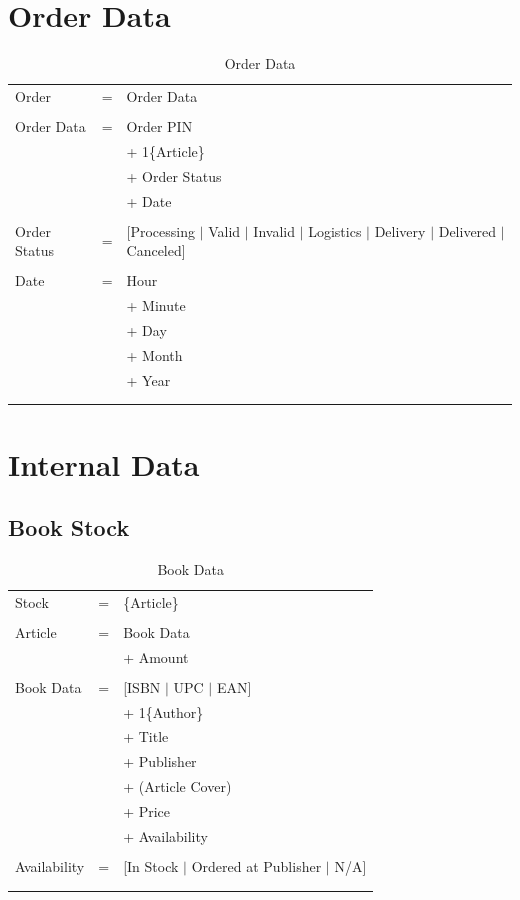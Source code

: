 \documentclass[11pt,a4paper,oneside,svgnames]{report}
\begin{document}
\section{Order Data}

\begin{longtable}{p{3.5cm}p{0.5cm}p{8.5cm}}
Order & = & Order Data\\
\\
Order Data & = & Order PIN\\
&  & + 1\{Article\}\\
&  & + Order Status\\
&  & + Date \\
\\
Order Status & = & [Processing $|$ Valid $|$ Invalid $|$ Logistics $|$ Delivery $|$ Delivered $|$ Canceled] \\
\\
Date & = & Hour\\
&  & + Minute\\
&  & + Day\\
&  & + Month\\
&  & + Year\\
\hfill\\
\caption{Order Data}\\
\end{longtable}

\section{Internal Data}

\subsection{Book Stock}
\begin{longtable}{p{3.5cm}p{0.5cm}p{8.5cm}}
Stock & = & \{Article\} \\
\\
Article & = & Book Data\\
&  & + Amount\\
\\
Book Data & = & [ISBN $|$ UPC $|$ EAN]\\
&  & + 1\{Author\}\\
&  & + Title\\
&  & + Publisher\\
&  & + (Article Cover)\\
&  & + Price\\
&  & + Availability\\
\\
Availability & = & [In Stock $|$ Ordered at Publisher $|$ N/A]\\
\hfill\\
\caption{Book Data}\\
\end{longtable}
\end{document}
